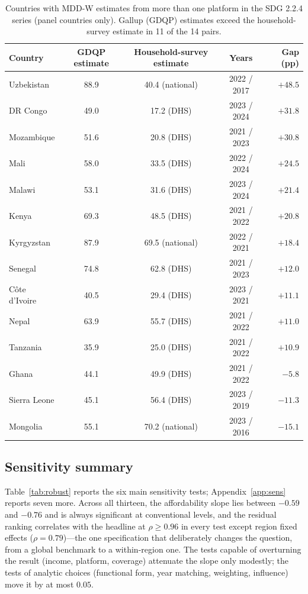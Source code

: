 \documentclass[11pt]{article}
\begin{document}
\begin{table}[tbp]
\centering\small
\caption{Countries with MDD-W estimates from more than one platform in the SDG 2.2.4 series (panel countries only). Gallup (GDQP) estimates exceed the household-survey estimate in 11 of the 14 pairs.}
\label{tab:dual}
\begin{tabular}{lcccr}
\toprule
Country & GDQP estimate & Household-survey estimate & Years & Gap (pp)\\
\midrule
Uzbekistan & 88.9 & 40.4 (national) & 2022 / 2017 & $+48.5$\\
DR Congo & 49.0 & 17.2 (DHS) & 2023 / 2024 & $+31.8$\\
Mozambique & 51.6 & 20.8 (DHS) & 2021 / 2023 & $+30.8$\\
Mali & 58.0 & 33.5 (DHS) & 2022 / 2024 & $+24.5$\\
Malawi & 53.1 & 31.6 (DHS) & 2023 / 2024 & $+21.4$\\
Kenya & 69.3 & 48.5 (DHS) & 2021 / 2022 & $+20.8$\\
Kyrgyzstan & 87.9 & 69.5 (national) & 2022 / 2021 & $+18.4$\\
Senegal & 74.8 & 62.8 (DHS) & 2021 / 2023 & $+12.0$\\
C\^ote d'Ivoire & 40.5 & 29.4 (DHS) & 2023 / 2021 & $+11.1$\\
Nepal & 63.9 & 55.7 (DHS) & 2021 / 2022 & $+11.0$\\
Tanzania & 35.9 & 25.0 (DHS) & 2021 / 2022 & $+10.9$\\
Ghana & 44.1 & 49.9 (DHS) & 2021 / 2022 & $-5.8$\\
Sierra Leone & 45.1 & 56.4 (DHS) & 2023 / 2019 & $-11.3$\\
Mongolia & 55.1 & 70.2 (national) & 2023 / 2016 & $-15.1$\\
\bottomrule
\end{tabular}
\end{table}

\subsection{Sensitivity summary}

Table~\ref{tab:robust} reports the six main sensitivity tests; Appendix~\ref{app:sens} reports seven more. Across all thirteen, the affordability slope lies between $-0.59$ and $-0.76$ and is always significant at conventional levels, and the residual ranking correlates with the headline at $\rho\geq0.96$ in every test except region fixed effects ($\rho=0.79$)---the one specification that deliberately changes the question, from a global benchmark to a within-region one. The tests capable of overturning the result (income, platform, coverage) attenuate the slope only modestly; the tests of analytic choices (functional form, year matching, weighting, influence) move it by at most $0.05$.
\end{document}
